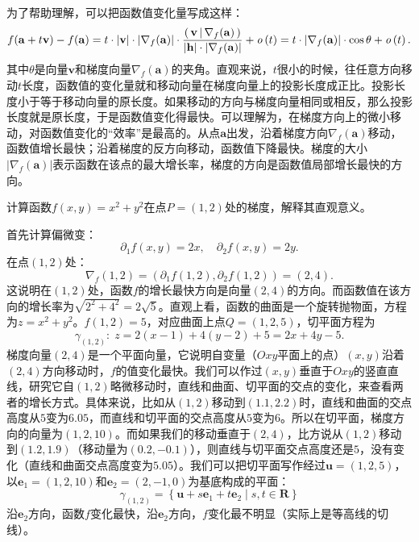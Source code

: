 \documentclass[12pt,UTF8,fontset=none]{ctexbook}
\begin{document}
为了帮助理解，可以把函数值变化量写成这样：
$$ f(\mathbf{a} + t \mathbf{v}) - f(\mathbf{a}) = t \cdot |\mathbf{v}| \cdot |\nabla_f(\mathbf{a})| \cdot \frac{\displaystyle\left( \,\mathbf{v} \,\middle\vert \,\nabla_f(\mathbf{a}) \,\right)}{|\mathbf{h}|\cdot|\nabla_f(\mathbf{a})|}  + \mathit{o}\left(t\right) =  t \cdot |\nabla_f(\mathbf{a})| \cdot \cos{\theta}  + \mathit{o}\left(t\right).$$
其中$\theta$是向量$\mathbf{v}$和梯度向量$\nabla_f(\mathbf{a})$的夹角。直观来说，$t$很小的时候，往任意方向移动$t$长度，函数值的变化量就和移动向量在梯度向量上的投影长度成正比。投影长度小于等于移动向量的原长度。如果移动的方向与梯度向量相同或相反，那么投影长度就是原长度，于是函数值变化得最快。可以理解为，在梯度方向上的微小移动，对函数值变化的“效率”是最高的。从点$\mathbf{a}$出发，沿着梯度方向$\nabla_f(\mathbf{a})$移动，函数值增长最快；沿着梯度的反方向移动，函数值下降最快。梯度的大小$|\nabla_f(\mathbf{a})|$表示函数在该点的最大增长率，梯度的方向是函数值局部增长最快的方向。

\begin{et}
计算函数$f(x,y) = x^2 + y^2$在点$P=(1,2)$处的梯度，解释其直观意义。
\end{et}
\begin{so}
首先计算偏微变：
$$ \partial_1 f(x,y) = 2x, \quad \partial_2 f(x,y) = 2y. $$
在点$(1,2)$处：
$$ \nabla_f(1,2) = (\partial_1 f(1,2), \partial_2 f(1,2)) = (2, 4). $$
这说明在$(1,2)$处，函数$f$的增长最快方向是向量$(2,4)$的方向。而函数值在该方向的增长率为$\sqrt{2^2 + 4^2} = 2\sqrt{5}$。直观上看，函数的曲面是一个旋转抛物面，方程为$z = x^2 + y^2$。$f(1,2) = 5$，对应曲面上点$Q=(1,2,5)$，切平面方程为
$$\gamma_{(1,2)}: \;z = 2(x - 1) + 4(y - 2) + 5 = 2x + 4y - 5. $$
梯度向量$(2,4)$是一个平面向量，它说明自变量（$Oxy$平面上的点）$(x,y)$沿着$(2,4)$方向移动时，$f$的值变化最快。我们可以作过$(x,y)$垂直于$Oxy$的竖直直线，研究它自$(1,2)$略微移动时，直线和曲面、切平面的交点的变化，来查看两者的增长方式。具体来说，比如从$(1,2)$移动到$(1.1,2.2)$时，直线和曲面的交点高度从$5$变为$6.05$，而直线和切平面的交点高度从$5$变为$6$。所以在切平面，梯度方向的向量为$(1,2,10)$。而如果我们的移动垂直于$(2,4)$，比方说从$(1,2)$移动到$(1.2, 1.9)$（移动量为$(0.2, -0.1)$），则直线与切平面交点高度还是$5$，没有变化（直线和曲面交点高度变为$5.05$）。我们可以把切平面写作经过$\mathbf{u}=(1,2,5)$，以$\mathbf{e}_1 = (1,2,10)$和$\mathbf{e}_2 = (2,-1,0)$为基底构成的平面：
$$ \gamma_{(1,2)} = \left\{ \mathbf{u} + s\mathbf{e}_1 + t\mathbf{e}_2 \; | \; s, t \in \mathbf{R}\right\} $$
沿$\mathbf{e}_2$方向，函数$f$变化最快，沿$\mathbf{e}_2$方向，$f$变化最不明显（实际上是等高线的切线）。
\end{so}
\end{document}
